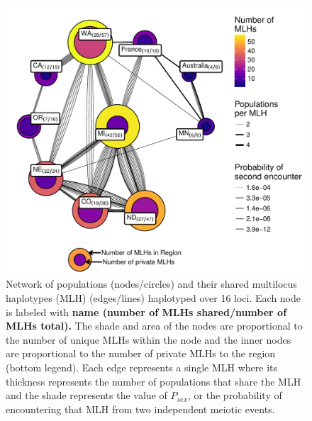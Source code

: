 \begin{figure}
\centering
\includegraphics[width=1.00000\textwidth]{../../results/figures/publication/mlg-16.pdf}
\caption{Network of populations (nodes/circles) and their shared
multilocus haplotypes (MLH) (edges/lines) haplotyped over 16 loci. Each
node is labeled with \textbf{name (number of MLHs shared/number of MLHs
total).} The shade and area of the nodes are proportional to the number
of unique MLHs within the node and the inner nodes are proportional to
the number of private MLHs to the region (bottom legend). Each edge
represents a single MLH where its thickness represents the number of
populations that share the MLH and the shade represents the value of
\(P_{sex}\), or the probability of encountering that MLH from two
independent meiotic events.}\label{community-graph16}
\end{figure}

